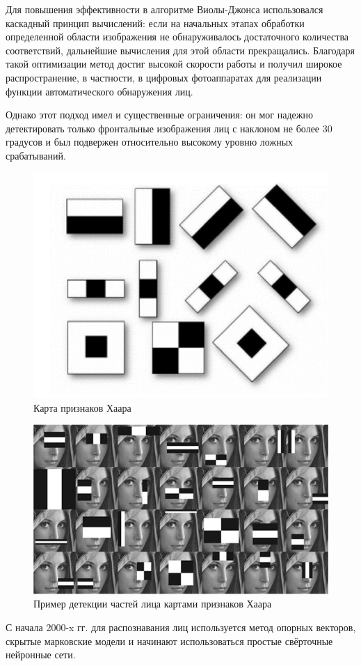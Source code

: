 Для повышения эффективности в алгоритме Виолы-Джонса использовался каскадный принцип вычислений: если на начальных этапах обработки определенной области изображения не обнаруживалось достаточного количества соответствий, дальнейшие вычисления для этой области прекращались. Благодаря такой оптимизации метод достиг высокой скорости работы и получил широкое распространение, в частности, в цифровых фотоаппаратах для реализации функции автоматического обнаружения лиц.

Однако этот подход имел и существенные ограничения: он мог надежно детектировать только фронтальные изображения лиц с наклоном не более 30 градусов и был подвержен относительно высокому уровню ложных срабатываний.
\begin{figure}[H]
	\centering
	\includegraphics[width=0.7\linewidth]{images/Haar}
	\caption{Карта признаков Хаара}
	\label{fig:haar}
\end{figure}
\begin{figure}[H]
	\centering
	\includegraphics[width=0.7\linewidth]{images/haar2}
	\caption{Пример детекции частей лица картами признаков Хаара}
	\label{fig:haar2}
\end{figure}

С начала 2000-x гг. для распознавания лиц используется метод опорных векторов, скрытые марковские модели и начинают использоваться простые свёрточные нейронные сети.

